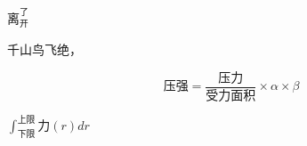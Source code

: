 \documentclass{article}
\begin{document}
$离_开^了$

千山鸟飞绝，


\[ 压强=\frac{压力}{受力面积}\times \alpha \times β \]

$ \int_{下限}^{上限} 力(r)dr $
\end{document}
